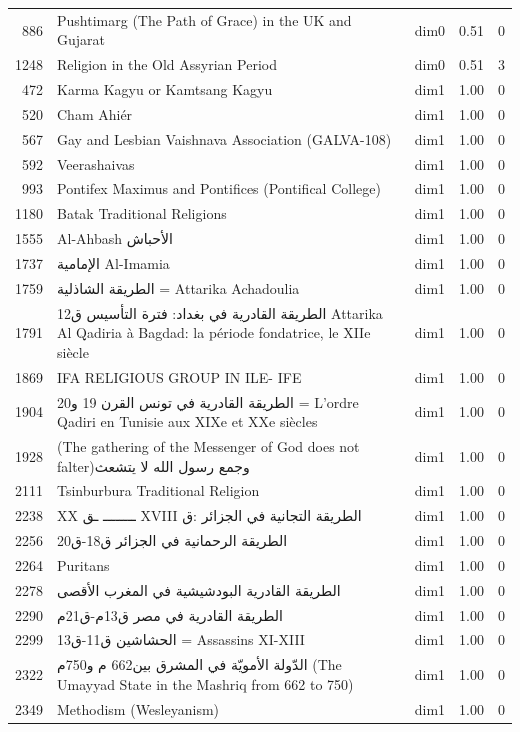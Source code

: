 \begin{tabular}{rllrr}
886 & Pushtimarg (The Path of Grace) in the UK and Gujarat & dim0 & 0.51 & 0 \\
1248 & Religion in the Old Assyrian Period & dim0 & 0.51 & 3 \\
472 & Karma Kagyu or Kamtsang Kagyu & dim1 & 1.00 & 0 \\
520 & Cham Ahiér & dim1 & 1.00 & 0 \\
567 & Gay and Lesbian Vaishnava Association (GALVA-108) & dim1 & 1.00 & 0 \\
592 & Veerashaivas & dim1 & 1.00 & 0 \\
993 & Pontifex Maximus and Pontifices (Pontifical College) & dim1 & 1.00 & 0 \\
1180 & Batak Traditional Religions & dim1 & 1.00 & 0 \\
1555 & Al-Ahbash الأحباش & dim1 & 1.00 & 0 \\
1737 & الإمامية Al-Imamia & dim1 & 1.00 & 0 \\
1759 & الطريقة الشاذلية = Attarika Achadoulia & dim1 & 1.00 & 0 \\
1791 & الطريقة القادرية في بغداد: فترة التأسيس ق12 Attarika Al Qadiria à Bagdad: la période fondatrice, le XIIe siècle & dim1 & 1.00 & 0 \\
1869 & IFA RELIGIOUS GROUP IN ILE- IFE & dim1 & 1.00 & 0 \\
1904 & الطريقة القادرية في تونس القرن  19 و20   =  L'ordre Qadiri en Tunisie aux XIXe et XXe siècles & dim1 & 1.00 & 0 \\
1928 & (The gathering of the Messenger of God does not falter)وجمع رسول الله لا يتشعث & dim1 & 1.00 & 0 \\
2111 & Tsinburbura Traditional Religion & dim1 & 1.00 & 0 \\
2238 & XX ــــــــ    ـق  XVIII   الطريقة التجانية في الجزائر :ق & dim1 & 1.00 & 0 \\
2256 & الطريقة الرحمانية في الجزائر  ق18-ق20 & dim1 & 1.00 & 0 \\
2264 & Puritans & dim1 & 1.00 & 0 \\
2278 & الطريقة القادرية البودشيشية في المغرب الأقصى & dim1 & 1.00 & 0 \\
2290 & الطريقة القادرية في مصر ق13م-ق21م & dim1 & 1.00 & 0 \\
2299 & الحشاشين  ق11-ق13   =   Assassins   XI-XIII & dim1 & 1.00 & 0 \\
2322 & الدّولة الأمويّة في المشرق  بين662 م و750م (The Umayyad State in the Mashriq from 662 to 750) & dim1 & 1.00 & 0 \\
2349 & Methodism (Wesleyanism) & dim1 & 1.00 & 0 \\

\end{tabular}
